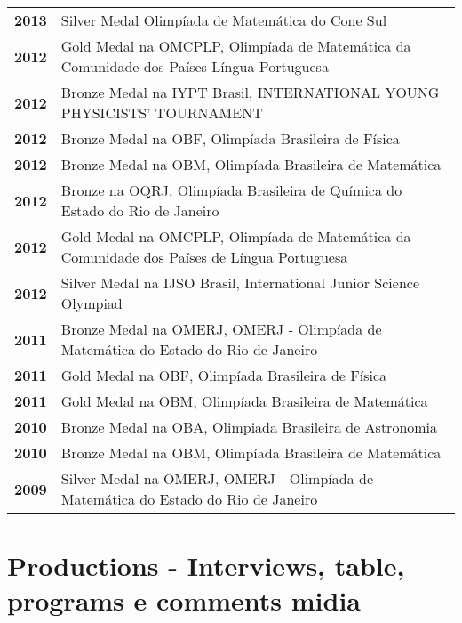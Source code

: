 \documentclass[a4paper, oneside, final]{report} %
\begin{document}
\begin{center}
\begin{tabular}{ @{} >{\bfseries}l @{\hspace{5ex}} l }
2013 & \multicolumn{1}{p{15cm}}{\raggedright Silver Medal Olimpíada de Matemática do Cone Sul} \\
2012 & \multicolumn{1}{p{15cm}}{\raggedright Gold Medal na OMCPLP, Olimpíada de Matemática da Comunidade dos Países Língua Portuguesa} \\
2012 & \multicolumn{1}{p{15cm}}{\raggedright Bronze Medal na IYPT Brasil, INTERNATIONAL YOUNG PHYSICISTS' TOURNAMENT} \\
2012 & \multicolumn{1}{p{15cm}}{\raggedright Bronze Medal na OBF, Olimpíada Brasileira de Física} \\
2012 & \multicolumn{1}{p{15cm}}{\raggedright Bronze Medal na OBM, Olimpíada Brasileira de Matemática} \\
2012 & \multicolumn{1}{p{15cm}}{\raggedright Bronze na OQRJ, Olimpíada Brasileira de Química do Estado do Rio de Janeiro} \\
2012 & \multicolumn{1}{p{15cm}}{\raggedright Gold Medal na OMCPLP, Olimpíada de Matemática da Comunidade dos Países de Língua Portuguesa} \\
2012 & \multicolumn{1}{p{15cm}}{\raggedright Silver Medal na IJSO Brasil, International Junior Science Olympiad} \\
2011 & \multicolumn{1}{p{15cm}}{\raggedright Bronze Medal na OMERJ, OMERJ - Olimpíada de Matemática do Estado do Rio de Janeiro} \\
2011 & \multicolumn{1}{p{15cm}}{\raggedright Gold Medal na OBF, Olimpíada Brasileira de Física} \\
2011 & \multicolumn{1}{p{15cm}}{\raggedright Gold Medal na OBM, Olimpíada Brasileira de Matemática} \\
2010 & \multicolumn{1}{p{15cm}}{\raggedright Bronze Medal na OBA, Olimpiada Brasileira de Astronomia} \\
2010 & \multicolumn{1}{p{15cm}}{\raggedright Bronze Medal na OBM, Olimpíada Brasileira de Matemática} \\
2009 & \multicolumn{1}{p{15cm}}{\raggedright Silver Medal na OMERJ, OMERJ - Olimpíada de Matemática do Estado do Rio de Janeiro}
\end{tabular}


\section{Productions - Interviews, table, programs e comments midia}


\end{center}
\end{document}
